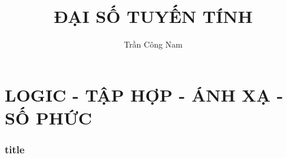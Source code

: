 \documentclass{article}
\title{ĐẠI SỐ TUYẾN TÍNH}
\author{Trần Công Nam}
\begin{document}
\maketitle

\part[short]{LOGIC - TẬP HỢP - ÁNH XẠ - SỐ PHỨC}
\section[short]{title}
\end{document}
